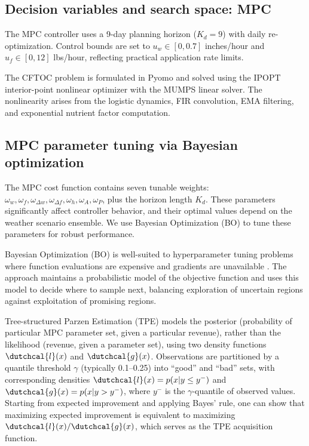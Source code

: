 \documentclass[pdflatex,sn-mathphys-num]{sn-jnl}
\begin{document}
\subsection{Decision variables and search space: MPC}\label{subsec:design-vars-mpc}

The MPC controller uses a 9-day planning horizon ($K_{d} = 9$) with daily re-optimization. Control bounds are set to $u_w \in [0, 0.7]$ inches/hour and $u_f \in [0, 12]$ lbs/hour, reflecting practical application rate limits.

The CFTOC problem is formulated in Pyomo \cite{bynum2021pyomo} and solved using the IPOPT interior-point nonlinear optimizer \cite{wachter2006ipopt} with the MUMPS linear solver. The nonlinearity arises from the logistic dynamics, FIR convolution, EMA filtering, and exponential nutrient factor computation.

\subsection{MPC parameter tuning via Bayesian optimization}\label{subsec:mpc-params}

The MPC cost function contains seven tunable weights: $\omega_w, \omega_f, \omega_{\Delta w}, \omega_{\Delta f}, \omega_h, \omega_A, \omega_P$, plus the horizon length $K_{d}$. These parameters significantly affect controller behavior, and their optimal values depend on the weather scenario ensemble. We use Bayesian Optimization (BO) to tune these parameters for robust performance.

Bayesian Optimization (BO) is well-suited to hyperparameter tuning problems where function evaluations are expensive and gradients are unavailable \cite{shahriari2016taking}. The approach maintains a probabilistic model of the objective function and uses this model to decide where to sample next, balancing exploration of uncertain regions against exploitation of promising regions.

Tree-structured Parzen Estimation (TPE) \cite{bergstra2011algorithms} models the posterior (probability of particular MPC parameter set, given a particular revenue), rather than the likelihood (revenue, given a parameter set), using two density functions $\dutchcal{l}(x)$ and $\dutchcal{g}(x)$. Observations are partitioned by a quantile threshold $\gamma$ (typically 0.1--0.25) into ``good'' and ``bad'' sets, with corresponding densities $\dutchcal{l}(x) = p(x|y\leq y^{-})$ and $\dutchcal{g}(x) = p(x|y > y^{-})$, where $y^{-}$ is the $\gamma$-quantile of observed values. Starting from expected improvement and applying Bayes' rule, one can show that maximizing expected improvement is equivalent to maximizing $\dutchcal{l}(x)/\dutchcal{g}(x)$, which serves as the TPE acquisition function.
\end{document}
